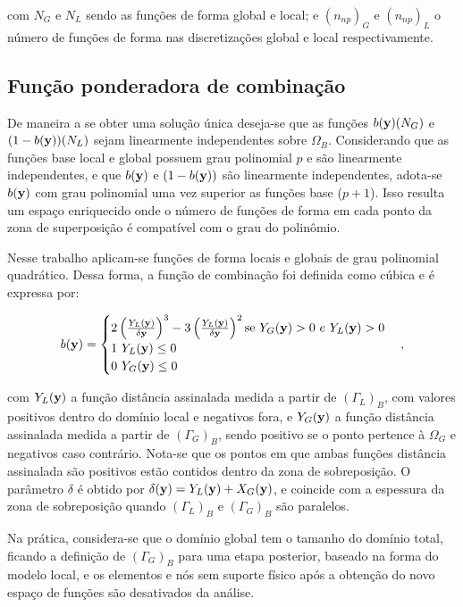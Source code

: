 \documentclass[tese_patricia]{subfiles}
\begin{document}
\noindent com $N_{G}$ e $N_{L}$ sendo as fun\c{c}\~oes de forma global e local; e $(n_{np})_G$ e $(n_{np})_L$ o n\'umero de fun\c{c}\~oes de forma nas discretiza\c{c}\~oes global e local respectivamente. 


\subsection{Função ponderadora de combinação}

De maneira a se obter uma solução  única deseja-se que as funções $b(\mathbf{y})(N_{G})$ e $(1-b(\mathbf{y}))(N_{L})$ sejam linearmente independentes sobre $\Omega_{B}$. Considerando que as funções base local e global possuem grau polinomial $p$ e são linearmente independentes, e que $b(\mathbf{y})$ e $(1-b(\mathbf{y}))$ são linearmente independentes, adota-se $b(\mathbf{y})$ com grau polinomial uma vez superior as funções base ($p+1$). Isso resulta um espaço enriquecido onde o número de funções de forma em cada ponto da zona de superposição é compatível com o grau do polinômio.  

Nesse trabalho aplicam-se funções de forma locais e globais de grau polinomial quadrático. Dessa forma, a função de combinação foi definida como cúbica e é expressa por:

\begin{align}
b(\mathbf{y}) =  \begin{cases} 2\left(\frac{Y_{L}(\mathbf{y})}{\delta\mathbf{y}}\right)^3  -   3\left(\frac{Y_{L}(\mathbf{y})}{\delta\mathbf{y}}\right)^2   \mbox{se } Y_{G}(\mathbf{y})> 0 \ e \ Y_{L}(\mathbf{y})> 0 \\
1  \ Y_{L}(\mathbf{y}) \leq 0  \\
0  \ Y_{G}(\mathbf{y}) \leq 0 \end{cases},
\end{align}

\noindent com $Y_{L}(\mathbf{y})$ a função distância assinalada medida a partir de $(\Gamma_{L})_{B}$, com valores positivos dentro do domínio local e negativos fora, e $Y_{G}(\mathbf{y})$ a função distância assinalada medida a partir de $(\Gamma_{G})_{B}$, sendo positivo se o ponto pertence à $\Omega_{G}$ e negativos caso contrário. Nota-se que os pontos em que ambas funções distância assinalada são positivos estão contidos dentro da zona de sobreposição. O parâmetro $\delta$ é obtido por $\delta(\mathbf{y}) = Y_{L}(\mathbf{y}) + X_{G}(\mathbf{y})$, e coincide com a espessura da zona de sobreposição quando $(\Gamma_{L})_{B}$ e $(\Gamma_{G})_{B}$ são paralelos.

Na prática, considera-se que o domínio global tem o tamanho do domínio total, ficando a definição de $(\Gamma_{G})_{B}$ para uma etapa posterior, baseado na forma do modelo local, e os elementos e nós sem suporte físico após a obtenção do novo espaço de funções são desativados da análise.
\end{document}
